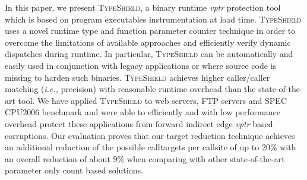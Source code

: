 
In this paper, we present \textsc{TypeShield}, a binary runtime \textit{vptr} protection tool which is
based on program executables instrumentation at load time.
\textsc{TypeShield} uses a novel runtime type and function parameter counter technique
in order to overcome the limitations of available approaches and efficiently verify dynamic 
dispatches during runtime. In particular, \textsc{TypeShield} can be automatically and easily used
in conjunction with legacy applications or where source code is missing to harden such binaries.
\textsc{TypeShield} achieves higher caller/caller matching (\textit{i.e.,} precision) with reasonable runtime overhead than 
the state-of-the-art tool. We have applied \textsc{TypeShield} to
web servers, FTP servers and SPEC CPU2006 benchmark and were able to efficiently
and with low performance overhead protect these applications from forward indirect edge
\textit{vptr} based corruptions.
Our evaluation proves that our target reduction technique achieves an additional
reduction of the possible calltargets per callsite of up to 20\% with an overall 
reduction of about 9\% when comparing with other state-of-the-art parameter only
count based solutions.
